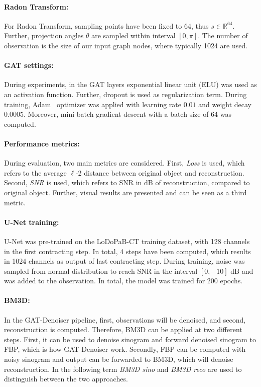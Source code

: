 \paragraph{Radon Transform:}
For Radon Transform, sampling points have been fixed to 64, thus $s \in \mathbb{R}^{64}$.
Further, projection angles $\theta$ are sampled within interval $[0, \pi]$.
The number of observation is the size of our input graph nodes, where typically 1024 are used.

\paragraph{GAT settings:}
During experiments, in the GAT layers exponential linear unit (ELU) was used as an activation function.
Further, dropout is used as regularization term.
During training, Adam~\cite{adam} optimizer was applied with learning rate $0.01$ and weight decay $0.0005$.
Moreover, mini batch gradient descent with a batch size of 64 was computed.

\paragraph{Performance metrics:}
During evaluation, two main metrics are considered.
First, \textit{Loss} is used, which refers to the average $\ell$-2 distance between original object and reconstruction.
Second, \textit{SNR} is used, which refers to SNR in dB of reconstruction, compared to original object.
Further, visual results are presented and can be seen as a third metric.


\paragraph{U-Net training:}
U-Net was pre-trained on the LoDoPaB-CT training dataset, with 128 channels in the first contracting step. 
In total, 4 steps have been computed, which results in 1024 channels as output of last contracting step.
During training, noise was sampled from normal distribution to reach SNR in the interval $[0, -10]$ dB 
and was added to the observation. In total, the model was trained for 200 epochs.

\paragraph{BM3D:}
In the GAT-Denoiser pipeline, first, observations will be denoised, and second, reconstruction is computed.
Therefore, BM3D can be applied at two different steps. First, it can be used to denoise sinogram
and forward denoised sinogram to FBP, which is how GAT-Denoiser work. Secondly, FBP can be
computed with noisy sinogram and output can be forwarded to BM3D, which will denoise reconstruction.
In the following term \textit{BM3D sino} and \textit{BM3D reco} are used to distinguish between the two approaches.

